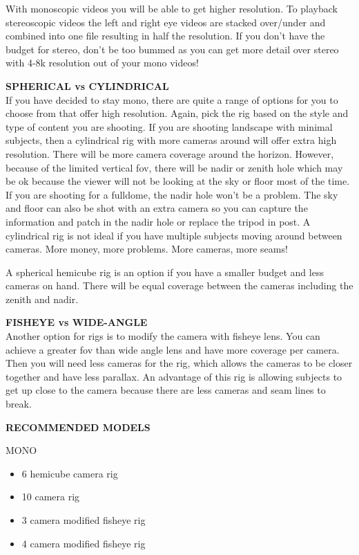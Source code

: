 \begin{fullwidth}
With monoscopic videos you will be able to get higher resolution. To playback stereoscopic videos the left and right eye videos are stacked over/under and combined into one file resulting in half the resolution. If you don’t have the budget for stereo, don’t be too bummed as you can get more detail over stereo with 4-8k resolution out of your mono videos!

{\bfseries SPHERICAL vs CYLINDRICAL}
\\
If you have decided to stay mono, there are quite a range of options for you to choose from that offer high resolution. Again, pick the rig based on the style and type of content you are shooting. If you are shooting landscape with minimal subjects, then a cylindrical rig with more cameras around will offer extra high resolution. There will be more camera coverage around the horizon. However, because of the limited vertical fov, there will be nadir or zenith hole which may be ok because the viewer will not be looking at the sky or floor most of the time. If you are shooting for a fulldome, the nadir hole won’t be a problem. The sky and floor can also be shot with an extra camera so you can capture the information and patch in the nadir hole or replace the tripod in post. A cylindrical rig is not ideal if you have multiple subjects moving around between cameras. More money, more problems. More cameras, more seams!

A spherical hemicube rig is an option if you have a smaller budget and less cameras on hand. There will be equal coverage between the cameras including the zenith and nadir. 

{\bfseries FISHEYE vs WIDE-ANGLE}
\\
Another option for rigs is to modify the camera with fisheye lens. You can achieve a greater fov than wide angle lens and have more coverage per camera. Then you will need less cameras for the rig, which allows the cameras to be closer together and have less parallax. An advantage of this rig is allowing subjects to get up close to the camera because there are less cameras and seam lines to break. 

{\bfseries RECOMMENDED MODELS}


MONO 
\begin{itemize}
\item 6 hemicube camera rig
\item 10 camera rig
\item 3 camera modified fisheye rig
\item 4 camera modified fisheye rig 
\end{itemize}


\end{fullwidth}
